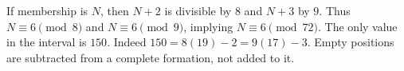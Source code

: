 If membership is $N$, then $N+2$ is divisible by $8$ and $N+3$ by $9$. Thus $N\equiv6\pmod8$ and $N\equiv6\pmod9$, implying $N\equiv6\pmod{72}$. The only value in the interval is $\boxed{150}$. Indeed $150=8(19)-2=9(17)-3$. Empty positions are subtracted from a complete formation, not added to it.

